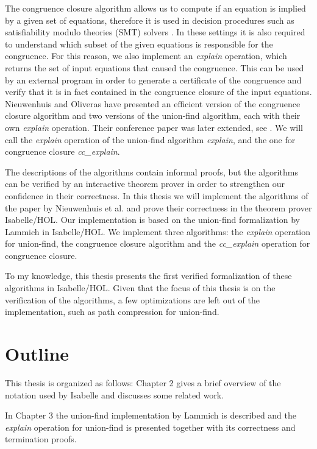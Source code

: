 The congruence closure algorithm allows us to compute if an equation is implied by a given set of equations, therefore it is used in decision procedures such as satisfiability modulo theories (SMT) solvers \cite{z3}.
In these settings it is also required to understand which subset of the given equations is responsible for the congruence. For this reason, we also implement an \emph{explain} operation, which returns the set of input equations that caused the congruence.
This can be used by an external program in order to generate a certificate of the congruence and verify that it is in fact contained in the congruence closure of the input equations.
Nieuwenhuis and Oliveras have presented an efficient version of the congruence closure algorithm and two versions of the union-find algorithm, each with their own \emph{explain} operation. Their conference paper \cite{Nieuwenhuis} was later extended, see \cite{Nieuwenhuis2}.
We will call the \emph{explain} operation of the union-find algorithm \emph{explain}, and the one for congruence closure \emph{cc\_explain}.

The descriptions of the algorithms contain informal proofs, but the algorithms can be verified by an interactive theorem prover in order to strengthen our confidence in their correctness. In this thesis we will implement the algorithms of the paper by Nieuwenhuis et al. \cite{Nieuwenhuis} and prove their correctness in the theorem prover Isabelle/HOL.
Our implementation is based on the union-find formalization by Lammich \cite{unionfind-isabelle} in Isabelle/HOL. We implement three algorithms: the \emph{explain} operation for union-find, the congruence closure algorithm and the \emph{cc\_explain} operation for congruence closure.

To my knowledge, this thesis presents the first verified formalization of these algorithms in Isabelle/HOL. Given that the focus of this thesis is on the verification of the algorithms, a few optimizations are left out of the implementation, such as path compression for union-find.

\section{Outline}
This thesis is organized as follows: Chapter 2 gives a brief overview of the notation used by Isabelle and discusses some related work.

In Chapter 3 the union-find implementation by Lammich \cite{unionfind-isabelle} is described and the \emph{explain} operation for union-find is presented together with its correctness and termination proofs.

